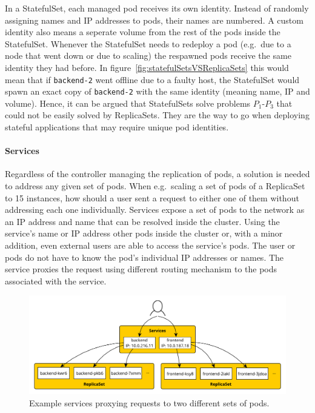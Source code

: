In a StatefulSet, each managed pod receives its own identity. Instead of
randomly assigning names and \ac{IP} addresses to pods, their names are
numbered. A custom identity also means a seperate volume from the rest of the
pods inside the StatefulSet. Whenever the StatefulSet needs to redeploy a pod
(e.g.\ due to a node that went down or due to scaling) the respawned pods
receive the same identity they had before. In
figure~\ref{fig:statefulSetsVSReplicaSets} this would mean that if
\texttt{backend-2} went offline due to a faulty host, the StatefulSet would
spawn an exact copy of \texttt{backend-2} with the same identity (meaning name,
\ac{IP} and volume). Hence, it can be argued that StatefulSets solve problems
$P_1$-$P_3$ that could not be easily solved by ReplicaSets. They are the way to
go when deploying stateful applications that may require unique pod identities.

\paragraph{Services}%
\label{par:Services}
Regardless of the controller managing the replication of pods, a solution is
needed to address any given set of pods. When e.g.\ scaling a set of pods of a
ReplicaSet to 15 instances, how should a user sent a request to either one of
them without addressing each one individually. Services expose a set of pods to
the network as an \ac{IP} address and name that can be resolved inside the
cluster. Using the service's name or \ac{IP} address other pods inside the
cluster or, with a minor addition, even external users are able to access the
service's pods. The user or pods do not have to know the pod's individual
\ac{IP} addresses or names. The service proxies the request using different
routing mechanism \autocite{AuthorsService2019} to the pods associated with the
service.

\begin{figure}[H]
\begin{center}
  \includegraphics[scale=0.55]{images/figures/service_example.pdf}
\end{center}
\caption{Example services proxying requests to two different sets of pods.}%
\label{fig:services_example}
\end{figure}

